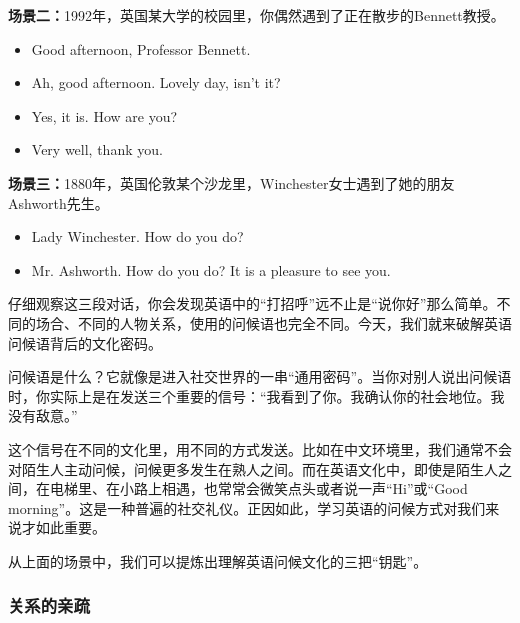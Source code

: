 \documentclass[10.5pt, a4paper]{ctexbook} %
\begin{document}
\textbf{场景二：}1992年，英国某大学的校园里，你偶然遇到了正在散步的Bennett教授。
\begin{center}
    \begin{minipage}{0.6\linewidth}
    \centering
        \begin{itemize}
            \item[你：] Good afternoon, Professor Bennett.
            \item[Bennett教授：] Ah, good afternoon. Lovely day, isn't it?
            \item[你：] Yes, it is. How are you?
            \item[Bennett教授：] Very well, thank you.
        \end{itemize}
    \end{minipage}
\end{center}


\textbf{场景三：}1880年，英国伦敦某个沙龙里，Winchester女士遇到了她的朋友Ashworth先生。
\begin{center}
    \begin{minipage}{0.6\linewidth}
    \centering
        \begin{itemize}
            \item[Ashworth先生：] Lady Winchester. How do you do?
            \item[Winchester女士：] Mr. Ashworth. How do you do? It is a pleasure to see you.
        \end{itemize}
    \end{minipage}
\end{center}

仔细观察这三段对话，你会发现英语中的“打招呼”远不止是“说你好”那么简单。不同的场合、不同的人物关系，使用的问候语也完全不同。今天，我们就来破解英语问候语背后的文化密码。

问候语是什么？它就像是进入社交世界的一串“通用密码”。当你对别人说出问候语时，你实际上是在发送三个重要的信号：“我看到了你。我确认你的社会地位。我没有敌意。”

这个信号在不同的文化里，用不同的方式发送。比如在中文环境里，我们通常不会对陌生人主动问候，问候更多发生在熟人之间。而在英语文化中，即使是陌生人之间，在电梯里、在小路上相遇，也常常会微笑点头或者说一声“Hi”或“Good morning”。这是一种普遍的社交礼仪。正因如此，学习英语的问候方式对我们来说才如此重要。

从上面的场景中，我们可以提炼出理解英语问候文化的三把“钥匙”。

\subsubsection*{关系的亲疏}
\end{document}
